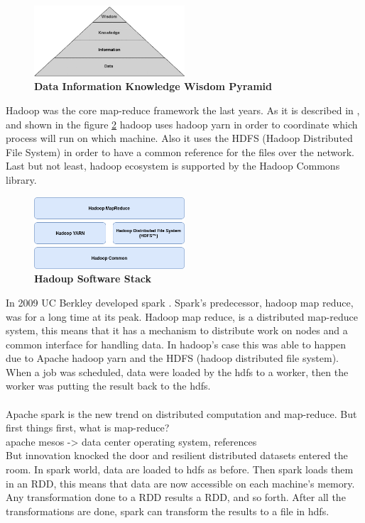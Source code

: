 \begin{figure}[h]
	\centering
	\includegraphics[width=0.5\textwidth]{images/DIKW.png}
	\caption{\bfseries Data Information Knowledge Wisdom Pyramid \cite{TheWisdomHierachy:7}}
	\label{dikw}
\end{figure}

Hadoop was the core map-reduce framework the last years.
As it is described in \cite{Hadoop:9}, and shown in the figure \ref{hadoopStack} hadoop uses hadoop yarn in order to coordinate which process will run on which machine. Also it uses the HDFS (Hadoop Distributed File System) in order to have a common reference for the files over the network. Last but not least, hadoop ecosystem is supported by the Hadoop Commons library. 

\begin{figure}[h]
	\centering
	\includegraphics[width=0.5\textwidth]{images/hadoop-stack.png}
	\caption{\bfseries Hadoup Software Stack}
	\label{hadoopStack}
\end{figure}

 In 2009 UC Berkley developed spark \cite{DatabricsSpark:8}.
Spark's predecessor, hadoop map reduce, was for a long time at its peak. Hadoop map reduce, is a distributed map-reduce system, this means that it has a mechanism to distribute work on nodes and a common interface for handling data. In hadoop's case this was able to happen due to Apache hadoop yarn and the HDFS (hadoop distributed file system). When a job was scheduled, data were loaded by the hdfs to a worker, then the worker was putting the result back to the hdfs. 

\paragraph{}Apache spark is the new trend on distributed computation and map-reduce. 
But first things first, what is map-reduce? \\
apache mesos -> data center operating system, references
\\
But innovation knocked the door and resilient distributed datasets entered the room. In spark world, data are loaded to hdfs as before. Then spark loads them in an RDD, this means that data are now accessible on each machine's memory. Any transformation done to a RDD results a RDD, and so forth. After all the transformations are done, spark can transform the results to a file in hdfs.

